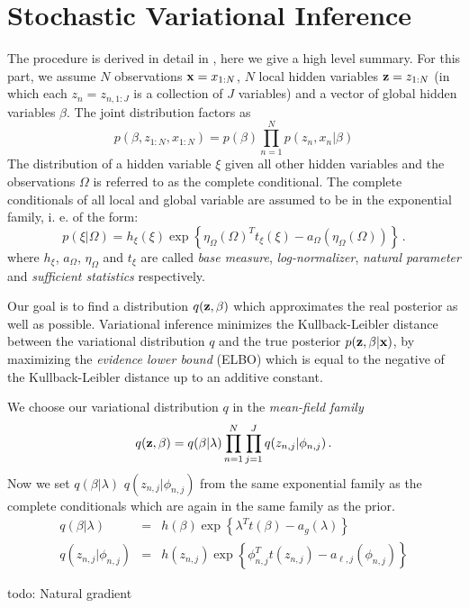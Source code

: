 \documentclass[12pt,abstracton,a4paper]{scrartcl}
\begin{document}
\section{Stochastic Variational Inference}
The procedure is derived in detail in \cite{Hoffman12}, here we give a high
level summary. For this part, we assume $N$ observations ${\bf x}=x_{1:N}$, $N$
local hidden variables ${\bf z}=z_{1:N}$ (in which each $z_n = z_{n,1:J}$ is a
collection of $J$ variables) and a vector of global hidden variables
$\beta$. The joint distribution factors as
\begin{equation}
    p(\beta, z_{1:N}, x_{1:N}) = p(\beta) \prod_{n=1}^N p(z_n,x_n|\beta)
\end{equation}
The distribution of a hidden variable $\xi$ given all other hidden variables and the
observations $\Omega$ is referred to as the complete conditional. The complete conditionals 
of all local and global variable are assumed to be in the exponential family, 
i. e. of the form:
\begin{equation}
    p(\xi|\Omega) =  h_\xi (\xi) \exp \left\{ \eta_\Omega(\Omega)^T t_\xi(\xi) -
        a_\Omega(\eta_\Omega(\Omega))
    \right\} \, .
\end{equation}
where $h_\xi$, $a_\Omega$, $\eta_\Omega$ and $t_\xi$ are called \textit{base
measure}, \textit{log-normalizer}, \textit{natural parameter} and
\textit{sufficient statistics} respectively.

Our goal is to find a distribution $q({\bf z}, \beta)$ which approximates the real posterior as
well as possible. Variational inference minimizes the Kullback-Leibler distance
between the variational distribution $q$ and the true posterior $p({\bf z}, \beta | {\bf
x})$, by maximizing the \textit{evidence lower bound} (ELBO) which is equal to
the negative of the Kullback-Leibler distance up to an additive constant.

We choose our variational distribution $q$ in the \textit{mean-field family}
\begin{equation}
    q({\bf z}, \beta) = q(\beta | \lambda) \prod_{n=1}^N\prod_{j=1}^J
    q(z_{n,j}|\phi_{n,j}) \,. 
\end{equation}
Now we set $q(\beta|\lambda)$ $q(z_{n,j}|\phi_{n,j})$ from the same exponential
family as the complete conditionals which are again in the same family as the
prior.
\begin{eqnarray}
    q(\beta|\lambda) &=& h(\beta) \exp\left\{ \lambda^T t(\beta) -
        a_g(\lambda) \right\} \\
    q(z_{n,j}|\phi_{n,j}) &=& h(z_{n,j}) \exp\left\{ \phi_{n,j}^Tt(z_{n,j})
        -a_{\ell,j}(\phi_{n,j}) \right\}
\end{eqnarray}

{\color{red} todo: Natural gradient}





\printbibliography
\end{document}
